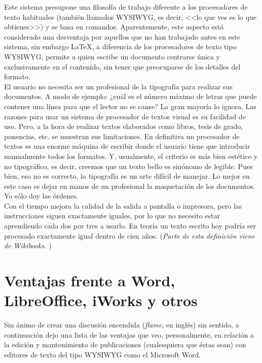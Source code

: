 \documentclass[11pt]{article}
\begin{document}
Este sistema presupone una filosofía de trabajo diferente a los procesadores de texto habituales (también llamados WYSIWYG, es decir, <<lo que ves es lo que obtienes>>) y se basa en comandos.
Aparentemente, este aspecto está considerado una desventaja por aquellos que no han trabajado antes en este sistema, sin embargo {\LaTeX}, a diferencia de los procesadores de texto tipo WYSIWYG, permite a quien escribe un documento centrarse única y exclusivamente en el contenido, sin tener que preocuparse de los detalles del formato.\\ 

El usuario no necesita ser un profesional de la tipografía para realizar sus documentos. A modo de ejemplo: ¿cuál es el número máximo de letras que puede contener una línea para que el lector no se canse? La gran mayoría lo ignora. Las razones para usar un sistema de procesador de textos visual es su facilidad de uso. Pero, a la hora de realizar textos elaborados como libros, tesis de grado, ponencias, etc. se muestran sus limitaciones. En definitiva un procesador de textos es una enorme máquina de escribir donde el usuario tiene que introducir manualmente todos los formatos. Y, usualmente, el criterio es más bien estético y no tipográfico, es decir, creemos que un texto bello es sinónomo de legible. Pues bien, eso no es correcto, la tipografía es un arte difícil de manejar. Lo mejor en este caso es dejar en manos de un profesional la maquetación de los documentos. Yo sólo doy las órdenes.\\

Con el tiempo mejora la calidad de la salida a pantalla o impresora, pero las instrucciones siguen exactamente iguales, por lo que no necesito estar aprendiendo cada dos por tres a usarlo. En teoría un texto escrito hoy podría ser procesado exactamente igual dentro de cien años. ({\em Parte de esta definición viene de Wikibooks. })\\

\section{Ventajas frente a Word, LibreOffice, iWorks y otros}

Sin ánimo de crear una discusión encendida ({\em flame}, en inglés) sin sentido, a
continuación dejo una lista de las ventajas que veo,
personalmente, en relación a la edición y mantenimiento de
publicaciones (cualesquiera que éstas sean) con editores
de texto del tipo WYSIWYG como el Microsoft Word.
\end{document}
